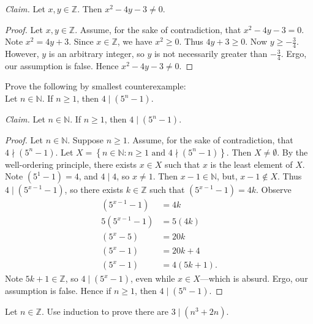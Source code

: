 \documentclass{article}
\newcommand{\Z}{\mathbb{Z}}
\theoremstyle{definition}
\begin{document}
\begin{solution}
\newline

\noindent\textit{Claim. }Let $x,y\in\Z$. Then $x^2-4y-3\neq 0$.
\begin{proof}
Let $x,y\in\Z$. Assume, for the sake of contradiction, that $x^2-4y-3=0$. Note $x^2=4y+3$. Since $x\in\Z$, we have $x^2\geq 0$. Thus $4y+3\geq 0$. Now $y\geq-\frac{3}{4}$. However, $y$ is an arbitrary integer, so $y$ is not necessarily greater than $-\frac{3}{4}$. Ergo, our assumption is false. Hence $x^2-4y-3\neq 0$. 
\end{proof}
\end{solution}
\begin{question}
    Prove the following by smallest counterexample:\\
    Let $n\in \mathbb{N}$. If $n\geq 1$, then $4 \mid (5^n-1)$.
\end{question}
\begin{solution}
\newline

\noindent\textit{Claim. }Let $n\in\mathbb{N}$. If $n\geq 1$, then $4\mid(5^n-1)$.
\begin{proof}
Let $n\in\mathbb{N}$. Suppose $n\geq 1$. Assume, for the sake of contradiction, that $4\nmid\left(5^n-1\right)$. Let $X=\left\{n\in\mathbb{N}:n\geq 1\text{ and }4\nmid\left(5^n-1\right)\right\}$. Then $X\neq\emptyset$. By the well-ordering principle, there exists $x\in X$ such that $x$ is the least element of $X$. Note $\left(5^1-1\right)=4$, and $4\mid 4$, so $x\neq 1$. Then $x-1\in\mathbb{N}$, but, $x-1\notin X$. Thus $4\mid\left(5^{x-1}-1\right)$, so there exists $k\in\Z$ such that $\left(5^{x-1}-1\right)=4k$. Observe
\begin{align*}
\left(5^{x-1}-1\right)&=4k\\
5\left(5^{x-1}-1\right)&=5(4k)\\
\left(5^x-5\right)&=20k\\
\left(5^x-1\right)&=20k+4\\
\left(5^x-1\right)&=4(5k+1).
\end{align*}
Note $5k+1\in\Z$, so $4\mid\left(5^x-1\right)$, even while $x\in X$---which is absurd. Ergo, our assumption is false. Hence if $n\geq 1$,  then $4\mid\left(5^n-1\right)$.
\end{proof}
\end{solution}
\begin{question}
    Let $n\in \Z$. Use induction to prove there are $3 \mid (n^3+2n)$. 
\end{question}
\end{document}
